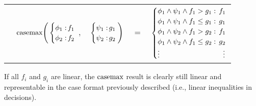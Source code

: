 {\footnotesize
\begin{center}
\begin{tabular}{r c c c l}
&
\hspace{-7mm} $\casemax \Bigg(
  \begin{cases}
    \phi_1: \hspace{-2mm} & \hspace{-1mm} f_1 \\ 
    \phi_2: \hspace{-2mm} & \hspace{-1mm} f_2 \\ 
  \end{cases}$
$,$
&
\hspace{-4mm}
  $\begin{cases}
    \psi_1: \hspace{-2mm} & \hspace{-1mm} g_1 \\ 
    \psi_2: \hspace{-2mm} & \hspace{-1mm} g_2 \\ 
  \end{cases} \Bigg)$
&
\hspace{-4mm} 
$ = $
&
\hspace{-4mm}
  $\begin{cases}
  \phi_1 \wedge \psi_1 \wedge f_1 > g_1    : & \hspace{-2mm} f_1 \\ 
  \phi_1 \wedge \psi_1 \wedge f_1 \leq g_1 : & \hspace{-2mm} g_1 \\ 
  \phi_1 \wedge \psi_2 \wedge f_1 > g_2    : & \hspace{-2mm}f_1 \\ 
  \phi_1 \wedge \psi_2 \wedge f_1 \leq g_2 : & \hspace{-2mm} g_2 \\ 
  \vdots & \vdots
  \end{cases}$
\end{tabular}
\end{center}
} If all $f_i$ and $g_i$ are linear,
the $\mathrm{casemax}$ result is clearly still linear and representable in the case format previously described (i.e., linear inequalities in decisions).

